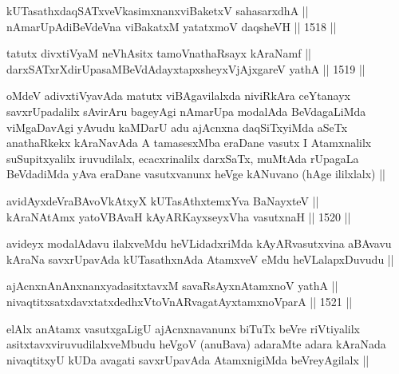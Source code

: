
\begin{shl}
kUTasathxdaqSATxveVkasimxnanxviBaketxV sahasarxdhA || \\
nAmarUpAdiBeVdeVna viBakatxM yatatxmoV daqsheVH ||  1518 ||  
\end{shl}
				
\begin{shl}
tatutx divxtiVyaM neVhAsitx tamoV\s nathaRsayx kAraNamf || \\
darxSATxrXdirUpasaMBeVdAdayxtapxsheyxVjAjxgareV yathA ||  1519 ||  
\end{shl}

\begin{artha}
oMdeV adivxtiVyavAda matutx viBAgavilalxda niviRkAra ceYtanayx savxrUpadalilx sAvirAru bageyAgi nAmarUpa modalAda BeVdagaLiMda viMgaDavAgi yAvudu kaMDarU adu ajAcnxna daqSiTxyiMda aSeTx anathaRkekx kAraNavAda A tamasesxMba eraDane vasutx I Atamxnalilx suSupitxyalilx iruvudilalx, ecacxrinalilx darxSaTx, muMtAda rUpagaLa BeVdadiMda yAva eraDane vasutxvanunx heVge kANuvano (hAge ililxlalx) ||
\end{artha}


\begin{shl}
avidAyxdeVraBAvoVkAtxyX kUTasAthxtemxYva BaNayxteV ||  \\
kAraNAtAmx yatoV\s BAvaH kAyARKayxseyxVha vasutxnaH ||  1520 ||  
\end{shl}

\begin{artha}
avideyx modalAdavu ilalxveMdu heVLidadxriMda kAyARvasutxvina aBAvavu kAraNa savxrUpavAda kUTasathxnAda AtamxveV eMdu heVLalapxDuvudu ||
\end{artha}


\begin{shl}
ajAcnxnAnAnxnanxyadasitxtavxM savaRsAyxnAtamxnoV yathA ||  \\
nivaqtitxsatxdavxtatxdedhxVtoVnARvagatAyxtamxnoV\s parA ||  1521 ||  
\end{shl}

\begin{artha}
elAlx anAtamx vasutxgaLigU ajAcnxnavanunx biTuTx beVre riVtiyalilx asitxtavxviruvudilalxveMbudu heVgoV (anuBava) adaraMte adara kAraNada nivaqtitxyU kUDa avagati savxrUpavAda AtamxnigiMda beVreyAgilalx ||
\end{artha}

